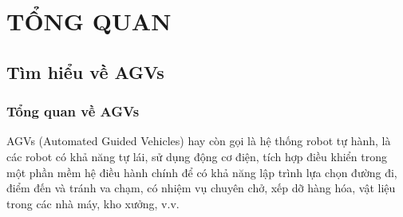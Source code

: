 \chapter{TỔNG QUAN}
    \section{Tìm hiểu về AGVs}
    \subsection{Tổng quan về AGVs}
    \hspace*{0.6cm}AGVs (Automated Guided Vehicles) hay còn gọi là hệ thống robot tự hành, là các robot có khả năng tự lái, sử dụng động cơ điện,
    tích hợp điều khiển trong một phần mềm hệ điều hành chính để có khả năng lập trình lựa chọn đường đi, điểm đến và tránh va chạm, 
    có nhiệm vụ chuyên chở, xếp dỡ hàng hóa, vật liệu trong các nhà máy, kho xưởng, v.v.
